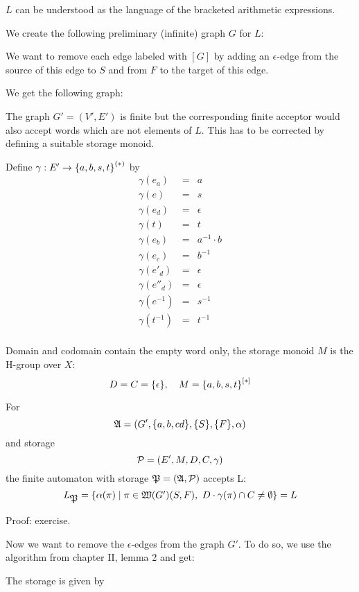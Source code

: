 $L$ can be understood as the language of the bracketed arithmetic expressions.

We create the following preliminary (infinite) graph $G$ for $L$:

\missingfigure

We want to remove each edge labeled with $[G]$ by adding an $\epsilon$-edge
from the source of this edge to $S$ and from $F$ to the target of this edge.

We get the following graph:

\missingfigure

The graph $G'=(V',E')$ is finite but the corresponding finite acceptor would
also accept words which are not elements of $L$. This has to be corrected by defining a
suitable storage monoid.

Define $\gamma: E' \to \mbox{${\mbox{$\{a, b, s, t\}$}}^{(*)}$}$ by
\begin{eqnarray*}
\gamma(e_a) & = & a \\
\gamma(e) & = & s \\
\gamma(e_d) & = & \epsilon \\
\gamma(t) & = & t \\
\gamma(e_b) & = & a^{-1} \cdot b \\
\gamma(e_c) & = & b^{-1} \\
\gamma(e'_d) & = & \epsilon \\
\gamma(e''_d) & = & \epsilon \\
\gamma(e^{-1}) & = & s^{-1} \\
\gamma(t^{-1}) & = & t^{-1} \\
\end{eqnarray*}

Domain and codomain contain the empty word only, the storage monoid $M$ is the
H-group over $X$:
\[ D = C = \mbox{$\{\epsilon\}$},\quad M = \mbox{${\mbox{$\{a, b, s, t\}$}}^{[*]}$} \]

For
\[ \mbox{$\mathfrak{A}$} = (G', \mbox{$\{a, b,c d\}$}, \mbox{$\{S\}$}, \mbox{$\{F\}$}, \alpha) \]
and storage 
\[ \mbox{$\mathcal{P}$} = (E', M, D, C, \gamma) \]
the finite automaton with storage $\mbox{$\mathfrak{P}$} = (\mbox{$\mathfrak{A}$}, \mbox{$\mathcal{P}$})$ accepts L:
\[ L_{\mbox{$\mathfrak{P}$}} = \mbox{$\{\alpha(\pi) \mid \pi \in \mbox{$\mathfrak{W}({G'})$}(S, F),\ D \cdot
\gamma(\pi) \cap C \neq \emptyset\}$} = L \]

Proof: exercise.

Now we want to remove the $\epsilon$-edges from the graph $G'$. To do so, we use
the algorithm from chapter II, lemma 2 and get:

\missingfigure

The storage is given by


